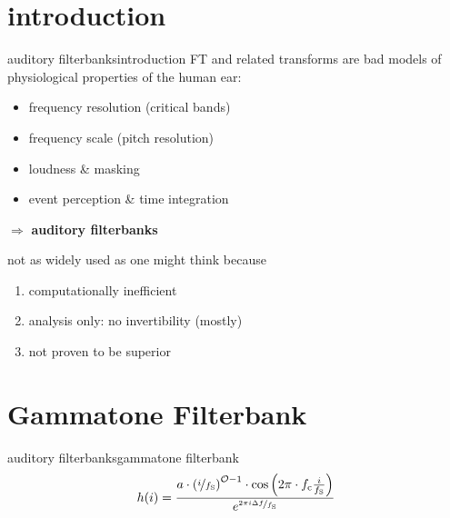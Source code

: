     \section[intro]{introduction}
        \begin{frame}{auditory filterbanks}{introduction}
            FT and related transforms are bad models of physiological properties of the human ear:
                \begin{itemize}
                    \item   frequency resolution (critical bands)
                    \item   frequency scale (pitch resolution)
                    \item   loudness \& masking
                    \item   event perception \&  time integration
                \end{itemize}
            
            \smallskip
            $\Rightarrow$ \textbf{auditory filterbanks}
            
            \pause
            \bigskip
            not as widely used as one might think because
            
            \begin{enumerate}
                \item<3->	computationally inefficient
                \item<3->	analysis only: no invertibility (mostly)
                \item<3->	not proven to be superior
            \end{enumerate}
        \end{frame}	
        
    \section[gammatone]{Gammatone Filterbank}
        \begin{frame}{auditory filterbanks}{gammatone filterbank}
            \vspace{-6mm}
            \begin{equation*}
                h(i) = \frac{ a \cdot\left(\nicefrac{i}{f_{\mathrm{S}}}\right)^{\mathcal{O}-1}\cdot \cos\left( 2\pi \cdot f_{\mathrm{c}} \frac{ i}{f_{\mathrm{S}}} \right) }{{e}^{\nicefrac{2\pi i \Delta f}{f_{\mathrm{S}}}}}
            \end{equation*}
            \vspace{-4mm}
        \end{frame}	
        
